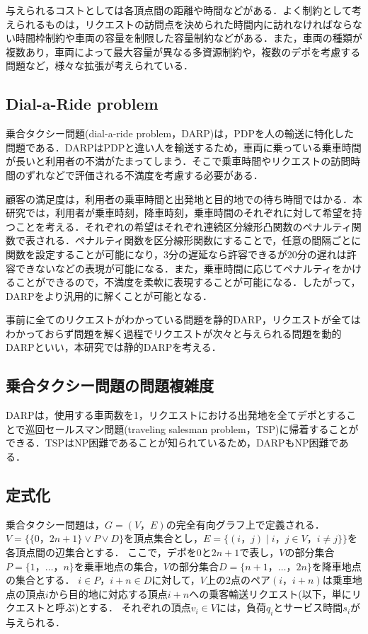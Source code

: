 \documentclass[a4j，11pt，twocolumn]{jsarticle}
\begin{document}
与えられるコストとしては各頂点間の距離や時間などがある．よく制約として考えられるものは，リクエストの訪問点を決められた時間内に訪れなければならない時間枠制約や車両の容量を制限した容量制約などがある．また，車両の種類が複数あり，車両によって最大容量が異なる多資源制約や，複数のデポを考慮する問題など，様々な拡張が考えられている．
\subsection{{\large Dial-a-Ride problem}}
乗合タクシー問題(dial-a-ride problem，DARP)は，PDPを人の輸送に特化した問題である．DARPはPDPと違い人を輸送するため，車両に乗っている乗車時間が長いと利用者の不満がたまってしまう．そこで乗車時間やリクエストの訪問時間のずれなどで評価される不満度を考慮する必要がある．

顧客の満足度は，利用者の乗車時間と出発地と目的地での待ち時間ではかる．本研究では，利用者が乗車時刻，降車時刻，乗車時間のそれぞれに対して希望を持つことを考える．それぞれの希望はそれぞれ連続区分線形凸関数のペナルティ関数で表される．ペナルティ関数を区分線形関数にすることで，任意の間隔ごとに関数を設定することが可能になり，3分の遅延なら許容できるが20分の遅れは許容できないなどの表現が可能になる．また，乗車時間に応じてペナルティをかけることができるので，不満度を柔軟に表現することが可能になる．したがって，DARPをより汎用的に解くことが可能となる．

事前に全てのリクエストがわかっている問題を静的DARP，リクエストが全てはわかっておらず問題を解く過程でリクエストが次々と与えられる問題を動的DARPといい，本研究では静的DARPを考える．

\subsection{乗合タクシー問題の問題複雑度}
DARPは，使用する車両数を1，リクエストにおける出発地を全てデポとすることで巡回セールスマン問題(traveling salesman problem，TSP)に帰着することができる．TSPはNP困難\cite{TSP}であることが知られているため，DARPもNP困難である．

\subsection{{\large 定式化}}
乗合タクシー問題は，$G = (V，E)$の完全有向グラフ上で定義される．$V =\{\{0，2n+1\} \lor P \lor D\}$を頂点集合とし，$E = \{(i，j) \mid i，j\in V ，i \neq j\}\}$を各頂点間の辺集合とする．
ここで，デポを$0$と$2n+1$で表し，$V$の部分集合$P =\{1，\ldots，n \}$を乗車地点の集合，$V$の部分集合$D =\{n+1，\ldots，2n \}$を降車地点の集合とする．
$i \in P$，$i+n \in D$に対して，$V$上の2点のペア$(i，i+n)$は乗車地点の頂点$i$から目的地に対応する頂点$i+n$への乗客輸送リクエスト(以下，単にリクエストと呼ぶ)とする．
それぞれの頂点$v_i \in V$には，負荷$q_i$とサービス時間$s_i$が与えられる．
\end{document}
